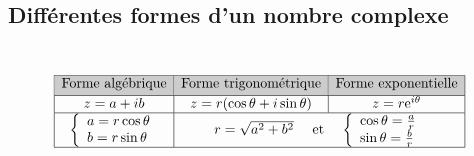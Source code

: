\TCDLessonStyleOff
\providecommand{\Reel}[1]{\mathfrak{Re}\left(#1\right)}
\providecommand{\Imag}[1]{\mathfrak{Im}\left(#1\right)}
\providecommand{\argmt}[1]{\mathrm{arg}\left( #1 \right)}
\providecommand{\mes}[2]{\mathrm{mes}\left( \widehat{ \overrightarrow{#1} , \overrightarrow{#2} } \right)}
\providecommand{\AngleEgal}[3]{#1 = #2 \quad \left[ #3 \right] }
\begin{fiche}
      \subsection*{Diff\'erentes formes d'un nombre complexe}~\\[-2.5\baselineskip]
            \[
                  \begin{array}{|c|c|c|}
                        \hline
                        \rowcolor[gray]{0.8}
                              \color{black}
                              \text{Forme algébrique} & \text{Forme trigonométrique}        & \text{Forme exponentielle} \\[2pt]
                        \hline
                              z = a + i b             & z = r (\cos \theta + i \sin \theta) & z = r \expo{i\theta}       \\
                        \hline
                              \displaystyle{
                                 \left\lbrace
                                    \begin{array}{l}
                                       a = r \cos \theta \\
                                       b = r \sin \theta 
                                    \end{array}
                                 \right.
                              }
                                                      & 
                                                  \multicolumn{2}{c|}{
                                                     r = \sqrt{a^2 + b^2}
                                                     \quad \text{ et } \quad 
                                                     \displaystyle{
                                                         \left\lbrace
                                                            \begin{array}{l}
                                                               \cos \theta = \frac{a}{r} \\
                                                               \sin \theta = \frac{b}{r} 
                                                            \end{array}
                                                         \right.
                                                      }
                                                                    }
                                                                                                                         \\
                        \hline
                  \end{array}
            \]
      ~\\[-2\baselineskip]

\end{fiche}
